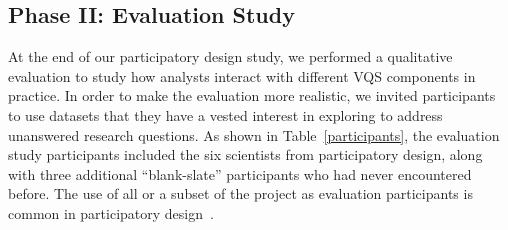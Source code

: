   \subsection{Phase II: Evaluation Study}
  At the end of our participatory design study, we performed a qualitative evaluation to study how analysts interact with different VQS components in practice. In order to make the evaluation more realistic, we invited participants to use datasets that they have a vested interest in exploring to address unanswered research questions. As shown in Table~\ref{participants}, the evaluation study participants included the six scientists from participatory design, along with three additional ``blank-slate'' participants who had never encountered \zvpp before. The use of all or a subset of the project  as evaluation participants is common in participatory design~\cite{Bossen2016}. 
